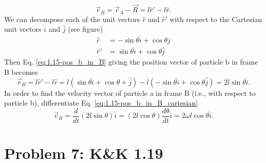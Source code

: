 \documentclass[solutions]{esg8012pset}
\begin{document}
\begin{enumerate}[a.]
      \begin{equation} \vec r_B = \vec r_A - \vec R = l\hat r' - l\hat r. \label{eq:1.15-pos_b_in_B} \end{equation}
      We can decompose each of the unit vectors $\hat r$ and $\hat r'$ with respect to the Cartesian unit vectors $\hat i$ and $\hat j$ (see figure)
      \begin{align}
        \hat r & = -\sin\theta \hat i + \cos\theta \hat j \label{eq:1.15-cartesian_r_hat} \\
        \hat r' & = \sin\theta \hat i + \cos\theta \hat j \label{eq:1.15-cartesian_r_hat'}
      \end{align}
      Then Eq. \ref{eq:1.15-pos_b_in_B} giving the position vector of particle b in frame B becomes
      \begin{equation}
        \vec r_B = l\hat r' - l\hat r = l(\sin\theta \hat i + \cos\theta + \hat j) - l(-\sin\theta \hat i + \cos\theta \hat j) = 2l\sin\theta \hat i. \label{eq:1.15-pos_b_in_B_cartesian}
      \end{equation}
      In order to find the velocity vector of particle a in frame B (i.e., with respect to particle b), differentiate Eq. \ref{eq:1.15-pos_b_in_B_cartesian}
      \begin{equation}
        \vec v_B = \frac{d}{dt}(2l\sin\theta) \hat i = (2l\cos\theta)\frac{d\theta}{dt}\hat i = 2\omega l \cos\theta \hat i.
      \end{equation}
  \end{enumerate}
\section*{Problem 7: K\&K 1.19}
\end{document}
